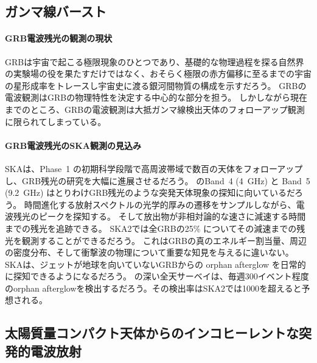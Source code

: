 
\subsection{ガンマ線バースト}
\label{c09.s2.ss2}

\paragraph{GRB電波残光の観測の現状}

GRBは宇宙で起こる極限現象のひとつであり、基礎的な物理過程を探る自然界の実験場の役を果たすだけではなく、おそらく極限の赤方偏移に至るまでの宇宙の星形成率をトレースし宇宙史に渡る銀河間物質の構成を示すだろう。
GRBの電波観測はGRBの物理特性を決定する中心的な部分を担う。
しかしながら現在までのところ、GRBの電波観測は大抵ガンマ線検出天体のフォローアップ観測に限られてしまっている。

\paragraph{GRB電波残光のSKA観測の見込み}

SKAは、Phase~1 の初期科学段階で高周波帯域で数百の天体をフォローアップし、GRB残光の研究を大幅に進展させるだろう。
のBand~4 (4~GHz) と Band~5 (9.2~GHz) はとりわけGRB残光のような突発天体現象の探知に向いているだろう。
時間進化する放射スペクトルの光学的厚みの遷移をサンプルしながら、電波残光のピークを探知する。
そして放出物が非相対論的な速さに減速する時間までの残光を追跡できる。
SKA2では全GRBの25\% についてその減速までの残光を観測することができるだろう。
これはGRBの真のエネルギー割当量、周辺の密度分布、そして衝撃波の物理について重要な知見を与えるに違いない。
SKAは、ジェットが地球を向いていないGRBからの orphan afterglow を日常的に探知できるようになるだろう。
 の深い全天サーベイは、毎週300イベント程度のorphan afterglowを検出するだろう。その検出率はSKA2では1000を超えると予想される。

\subsection{太陽質量コンパクト天体からのインコヒーレントな突発的電波放射}
\label{c09.s2.ss3}

